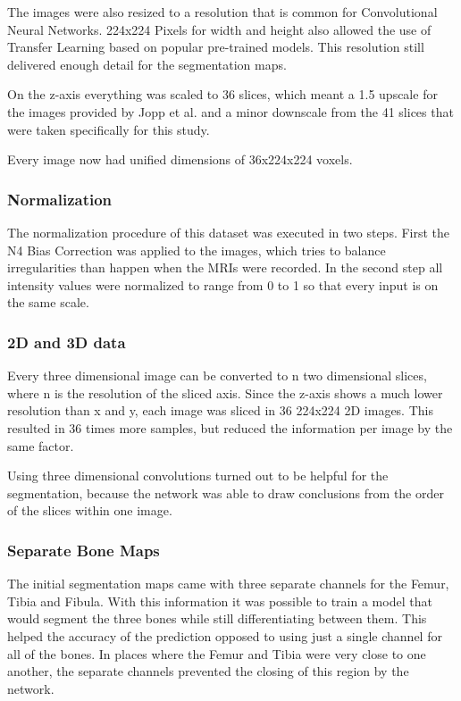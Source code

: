 The images were also resized to a resolution that is common for Convolutional Neural Networks. 224x224 Pixels for width and height also allowed the use of Transfer Learning based on popular pre-trained models. This resolution still delivered enough detail for the segmentation maps.

On the z-axis everything was scaled to 36 slices, which meant a 1.5 upscale for the images provided by Jopp et al. and a minor downscale from the 41 slices that were taken specifically for this study.

Every image now had unified dimensions of 36x224x224 voxels.

\subsubsection{Normalization}

The normalization procedure of this dataset was executed in two steps. First the N4 Bias Correction was applied to the images, which tries to balance irregularities than happen when the MRIs were recorded. In the second step all intensity values were normalized to range from 0 to 1 so that every input is on the same scale.

\subsubsection{2D and 3D data}

Every three dimensional image can be converted to n two dimensional slices, where n is the resolution of the sliced axis. Since the z-axis shows a much lower resolution than x and y, each image was sliced in 36 224x224 2D images. This resulted in 36 times more samples, but reduced the information per image by the same factor. 

Using three dimensional convolutions turned out to be helpful for the segmentation, because the network was able to draw conclusions from the order of the slices within one image. 

\subsubsection{Separate Bone Maps}

The initial segmentation maps came with three separate channels for the Femur, Tibia and Fibula. With this information it was possible to train a model that would segment the three bones while still differentiating between them. This helped the accuracy of the prediction opposed to using just a single channel for all of the bones. In places where the Femur and Tibia were very close to one another, the separate channels prevented the closing of this region by the network.

